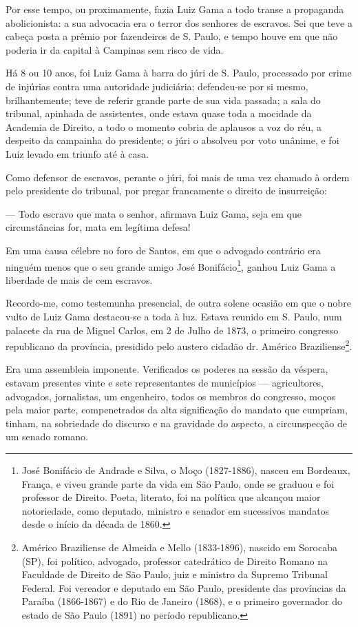 Por esse tempo, ou proximamente, fazia Luiz Gama a todo transe a
propaganda abolicionista: a sua advocacia era o terror dos senhores de
escravos. Sei que teve a cabeça posta a prêmio por fazendeiros de S.
Paulo, e tempo houve em que não poderia ir da capital à Campinas sem
risco de vida.

Há 8 ou 10 anos, foi Luiz Gama à barra do júri de S. Paulo, processado
por crime de injúrias contra uma autoridade judiciária; defendeu-se por
si mesmo, brilhantemente; teve de referir grande parte de sua vida
passada; a sala do tribunal, apinhada de assistentes, onde estava quase
toda a mocidade da Academia de Direito, a todo o momento cobria de
aplausos a voz do réu, a despeito da campainha do presidente; o júri o
absolveu por voto unânime, e foi Luiz levado em triunfo até à casa.

Como defensor de escravos, perante o júri, foi mais de uma vez chamado à
ordem pelo presidente do tribunal, por pregar francamente o direito de
insurreição:

--- Todo escravo que mata o senhor, afirmava Luiz Gama, seja em que
circunstâncias for, mata em legítima defesa!

Em uma causa célebre no foro de Santos, em que o advogado contrário era
ninguém menos que o seu grande amigo José Bonifácio\footnote{José
  Bonifácio de Andrade e Silva, o Moço (1827-1886), nasceu em Bordeaux,
  França, e viveu grande parte da vida em São Paulo, onde se graduou e
  foi professor de Direito. Poeta, literato, foi na política que
  alcançou maior notoriedade, como deputado, ministro e senador em
  sucessivos mandatos desde o início da década de 1860.}, ganhou Luiz
Gama a liberdade de mais de cem escravos.

Recordo-me, como testemunha presencial, de outra solene ocasião em que o
nobre vulto de Luiz Gama destacou-se a toda à luz. Estava reunido em S.
Paulo, num palacete da rua de Miguel Carlos, em 2 de Julho de 1873, o
primeiro congresso republicano da província, presidido pelo austero
cidadão dr. Américo Braziliense\footnote{Américo Braziliense de
  Almeida e Mello (1833-1896), nascido em Sorocaba (SP), foi político,
  advogado, professor catedrático de Direito Romano na Faculdade de
  Direito de São Paulo, juiz e ministro da Supremo Tribunal Federal. Foi
  vereador e deputado em São Paulo, presidente das províncias da Paraíba
  (1866-1867) e do Rio de Janeiro (1868), e o primeiro governador do
  estado de São Paulo (1891) no período republicano.}.

Era uma assembleia imponente. Verificados os poderes na sessão da
véspera, estavam presentes vinte e sete representantes de municípios
--- agricultores, advogados, jornalistas, um engenheiro, todos os
membros do congresso, moços pela maior parte, compenetrados da alta
significação do mandato que cumpriam, tinham, na sobriedade do discurso
e na gravidade do aspecto, a circunspecção de um senado romano.

